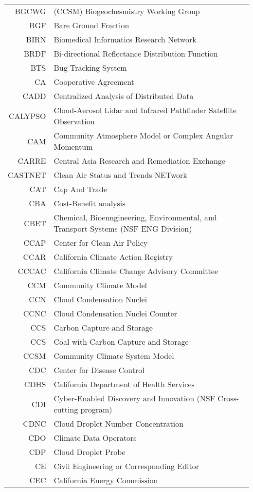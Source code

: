 \documentclass[12pt,twoside]{article}
\begin{document}
\begin{longtable}[>{\bfseries}l]{>{\ttfamily}r l}
BGCWG & (CCSM) Biogeochesmistry Working Group \\
BGF & Bare Ground Fraction \\
BIRN & Biomedical Informatics Research Network \\
BRDF & Bi-directional Reflectance Distribution Function \\
BTS & Bug Tracking System \\
CA & Cooperative Agreement \\
CADD & Centralized Analysis of Distributed Data \\
CALYPSO & Cloud-Aerosol Lidar and Infrared Pathfinder Satellite Observation \\
CAM & Community Atmosphere Model or Complex Angular Momentum \\
CARRE & Central Asia Research and Remediation Exchange \\
CASTNET & Clean Air Status and Trends NETwork \\
CAT & Cap And Trade \\
CBA & Cost-Benefit analysis \\
CBET & Chemical, Bioenngineering, Environmental, and Transport Systems (NSF ENG Division) \\
CCAP & Center for Clean Air Policy \\
CCAR & California Climate Action Registry \\
CCCAC & California Climate Change Advisory Committee \\
CCM & Community Climate Model \\
CCN & Cloud Condensation Nuclei \\
CCNC & Cloud Condensation Nuclei Counter \\ 
CCS & Carbon Capture and Storage \\
CCS & Coal with Carbon Capture and Storage \\
CCSM & Community Climate System Model \\
CDC & Center for Disease Control \\
CDHS & California Department of Health Services \\
CDI & Cyber-Enabled Discovery and Innovation (NSF Cross-cutting program) \\
CDNC & Cloud Droplet Number Concentration \\
CDO & Climate Data Operators \\
CDP & Cloud Droplet Probe \\ 
CE & Civil Engineering or Corresponding Editor \\
CEC & California Energy Commission \\

\end{longtable}
\end{document}
